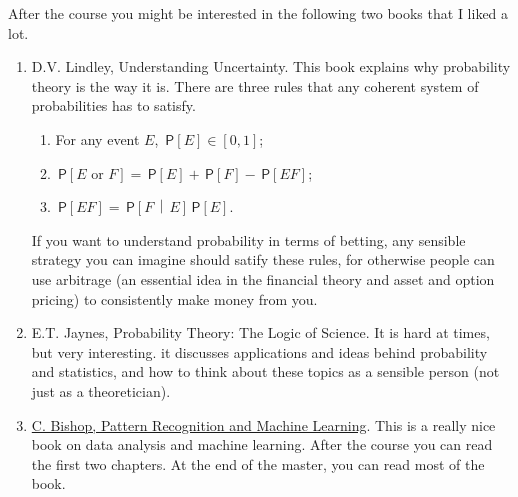 \documentclass[a4paper]{article}
\theoremstyle{definition}
\newcommand{\given}{\,\middle|\,}
\renewcommand{\P}[1]{\,\mathsf{P}\left[#1\right]}
\newcommand{\1}[1]{\,I_{#1}} %
\begin{document}
After the course you might be interested in the following two books that I liked a lot. 
\begin{enumerate}
\item D.V. Lindley, Understanding Uncertainty. This book explains why probability theory is the way it is. There are three rules that any coherent system of probabilities has to satisfy. 
\begin{enumerate}
\item For any event \(E\), \(\P{E} \in [0,1]\);
\item \(\P{E \text{ or } F} = \P{E} + \P{F} - \P{EF}\);
\item \(\P{EF} = \P{F\given E} \P{E}\).
\end{enumerate}
If you want to understand probability in terms of betting, any sensible strategy you can imagine should satify   these rules, for otherwise people can use arbitrage (an essential idea in the financial theory and asset and option pricing) to consistently make  money from you.
\item E.T. Jaynes, Probability Theory: The Logic of Science. It is hard at times, but very interesting. it discusses  applications and ideas behind probability and statistics, and how to think about these topics as a sensible person (not just as a theoretician).
\item \href{https://www.microsoft.com/en-us/research/uploads/prod/2006/01/Bishop-Pattern-Recognition-and-Machine-Learning-2006.pdf}{C. Bishop, Pattern Recognition and Machine Learning}. This is a really nice book on data analysis and  machine learning. After the course you can read the first two chapters. At the end of the master, you can read most of the book.
\end{enumerate}
\end{document}
